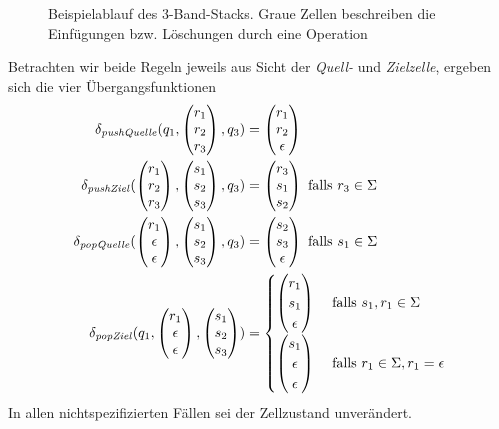 \documentclass{article}
\begin{document}
\begin{figure}[h]
    \caption{Beispielablauf des 3-Band-Stacks. Graue Zellen beschreiben die Einfügungen bzw. Löschungen durch eine Operation}
\end{figure}
Betrachten wir beide Regeln jeweils aus Sicht der \emph{Quell-} und \emph{Zielzelle}, ergeben sich die vier Übergangsfunktionen
\begin{align*}
    \delta_{\mathit{pushQuelle}}(q_1,\begin{pmatrix}r_1\\r_2\\r_3\end{pmatrix},q_3) &= \begin{pmatrix}r_1\\r_2\\\epsilon\end{pmatrix} \\
    \delta_{\mathit{pushZiel}}(\begin{pmatrix}r_1\\r_2\\r_3\end{pmatrix},\begin{pmatrix}s_1\\s_2\\s_3\end{pmatrix},q_3) &= \begin{pmatrix}r_3\\s_1\\s_2\end{pmatrix} \text{ falls } r_3 \in \Sigma \\
    \delta_{\mathit{popQuelle}}(\begin{pmatrix}r_1\\\epsilon\\\epsilon\end{pmatrix},\begin{pmatrix}s_1\\s_2\\s_3\end{pmatrix},q_3) &= \begin{pmatrix}s_2\\s_3\\\epsilon\end{pmatrix} \text { falls } s_1 \in \Sigma \\
    \delta_{\mathit{popZiel}}(q_1,\begin{pmatrix}r_1\\\epsilon\\\epsilon\end{pmatrix},\begin{pmatrix}s_1\\s_2\\s_3\end{pmatrix}) &= \begin{cases}
        \begin{pmatrix}r_1\\s_1\\\epsilon\end{pmatrix} &\text { falls } s_1,r_1 \in \Sigma \\
        \begin{pmatrix}s_1\\\epsilon\\\epsilon\end{pmatrix} &\text { falls } r_1 \in \Sigma, r_1 = \epsilon
    \end{cases}
\end{align*}
In allen nichtspezifizierten Fällen sei der Zellzustand unverändert.
\end{document}
